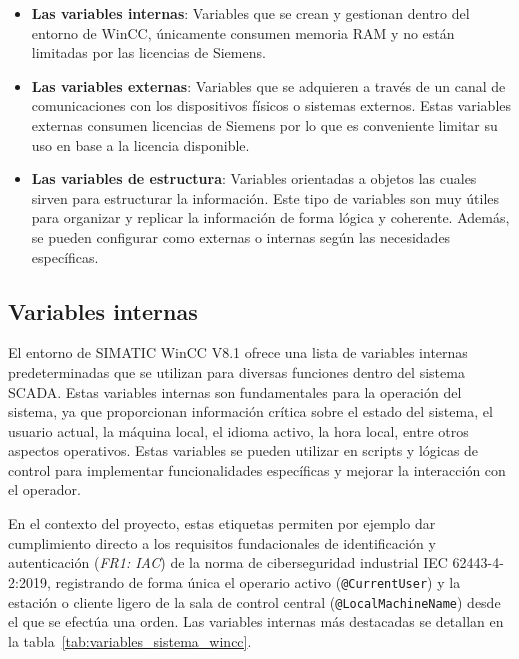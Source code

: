 \begin{itemize}
    \item \textbf{Las variables internas}: Variables que se crean y gestionan dentro del entorno de WinCC, únicamente consumen memoria \ac{RAM} y no están limitadas por las licencias de Siemens. 
    \item \textbf{Las variables externas}: Variables que se adquieren a través de un canal de comunicaciones con los dispositivos físicos o sistemas externos. Estas variables externas consumen licencias de Siemens por lo que es conveniente limitar su uso en base a la licencia disponible.
    \item \textbf{Las variables de estructura}: Variables orientadas a objetos las cuales sirven para estructurar la información. Este tipo de variables son muy útiles para organizar y replicar la información de forma lógica y coherente. Además, se pueden configurar como externas o internas según las necesidades específicas.\par
\end{itemize}    
\subsection{Variables internas}
El entorno de SIMATIC WinCC V8.1 ofrece una lista de variables internas predeterminadas que se utilizan para diversas funciones dentro del sistema SCADA. Estas variables internas son fundamentales para la operación del sistema, ya que proporcionan información crítica sobre el estado del sistema, el usuario actual, la máquina local, el idioma activo, la hora local, entre otros aspectos operativos. Estas variables se pueden utilizar en scripts y lógicas de control para implementar funcionalidades específicas y mejorar la interacción con el operador. \par 

En el contexto del proyecto, estas etiquetas permiten por ejemplo dar cumplimiento directo a los requisitos fundacionales de identificación y autenticación (\textit{FR1: IAC}) de la norma de ciberseguridad industrial IEC 62443-4-2:2019, registrando de forma única el operario activo (\texttt{@CurrentUser}) y la estación o cliente ligero de la sala de control central (\texttt{@LocalMachineName}) desde el que se efectúa una orden. Las variables internas más destacadas se detallan en la tabla~\ref{tab:variables_sistema_wincc}.

